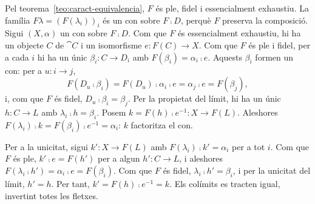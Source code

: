 \begin{prova}
Pel teorema~\ref{teo:caract-equivalencia}, $F$ és ple, fidel i essencialment exhaustiu. La família $F\lambda=(F(\lambda_i))_i$ és un con sobre $F\comp D$, perquè $F$ preserva la composició. Sigui $(X,\alpha)$ un con sobre $F\comp D$. Com que $F$ és essencialment exhaustiu, hi ha un objecte $C$ de $\cat{C}$ i un isomorfisme $e\colon F(C)\to X$. Com que $F$ és ple i fidel, per a cada $i$ hi ha un únic $\beta_i\colon C\to D_i$ amb $F(\beta_i)=\alpha_i\comp e$. Aquests $\beta_i$ formen un con: per a $u\colon i\to j$,
\[
F(D_u\comp\beta_i)=F(D_u)\comp\alpha_i\comp e=\alpha_j\comp e=F(\beta_j),
\]
i, com que $F$ és fidel, $D_u\comp\beta_i=\beta_j$. Per la propietat del límit, hi ha un únic $h\colon C\to L$ amb $\lambda_i\comp h=\beta_i$. Posem $k=F(h)\comp e^{-1}\colon X\to F(L)$. Aleshores $F(\lambda_i)\comp k=F(\beta_i)\comp e^{-1}=\alpha_i$: $k$ factoritza el con.

Per a la unicitat, sigui $k'\colon X\to F(L)$ amb $F(\lambda_i)\comp k'=\alpha_i$ per a tot $i$. Com que $F$ és ple, $k'\comp e=F(h')$ per a algun $h'\colon C\to L$, i aleshores $F(\lambda_i\comp h')=\alpha_i\comp e=F(\beta_i)$. Com que $F$ és fidel, $\lambda_i\comp h'=\beta_i$, i per la unicitat del límit, $h'=h$. Per tant, $k'=F(h)\comp e^{-1}=k$. Els colímits es tracten igual, invertint totes les fletxes.
\end{prova}

